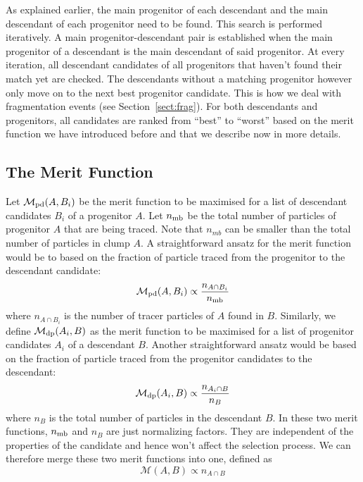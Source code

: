 As explained earlier, the main progenitor of each descendant and the
main descendant of each progenitor need to be found.  This search is
performed iteratively.  A main progenitor-descendant pair is
established when the main progenitor of a descendant is the main
descendant of said progenitor.  At every iteration, all descendant
candidates of all progenitors that haven't found their match yet are
checked. The descendants without a matching progenitor however only
move on to the next best progenitor candidate.  This is how we deal
with fragmentation events (see Section~\ref{sect:frag}).  For both
descendants and progenitors, all candidates are ranked from ``best''
to ``worst'' based on the merit function we have introduced before and
that we describe now in more details.

\subsection{The Merit Function}

Let $\mathcal{M}_{\rm pd}(A,B_i)$ be the merit function to be
maximised for a list of descendant candidates $B_i$ of a progenitor
$A$. Let $n_{\rm mb}$ be the total number of particles of progenitor
$A$ that are being traced. Note that $n_{mb}$ can be smaller than the
total number of particles in clump $A$.  A straightforward ansatz for
the merit function would be to based on the fraction of particle traced from the
progenitor to the descendant candidate:
\begin{equation}
\mathcal{M}_{\rm pd}(A,B_i) \propto \frac{n_{A \cap B_i}}{n_{\rm mb}}
\end{equation}
where $n_{A \cap B_i}$ is the number of tracer particles of $A$ found
in $B$.  Similarly, we define $\mathcal{M}_{\rm dp}(A_i,B)$ as the
merit function to be maximised for a list of progenitor candidates
$A_i$ of a descendant $B$. Another straightforward ansatz would be
based on the fraction of particle traced from the progenitor
candidates to the descendant:
\begin{equation}
\mathcal{M}_{\rm dp}(A_i,B) \propto \frac{n_{A_i \cap B}}{n_B}
\end{equation}
where $n_B$ is the total number of particles in the descendant $B$.
In these two merit functions, $n_{\rm mb}$ and $n_B$ are just
normalizing factors. They are independent of the properties of the
candidate and hence won't affect the selection process.  We can
therefore merge these two merit functions into one, defined as
\begin{equation}
\mathcal{M}(A,B) \propto n_{A \cap B}
\end{equation}

